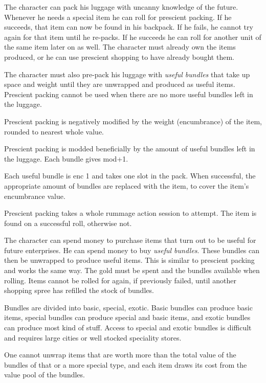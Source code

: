  The character can pack his luggage with uncanny knowledge of the future. Whenever he needs a special item he can roll for prescient packing. If he succeeds, that item can now be found in his backpack. If he fails, he cannot try again for that item until he re-packs. If he succeeds he can roll for another unit of the same item later on as well.
The character must already own the items produced, or he can use prescient shopping to have already bought them.

The character must also pre-pack his luggage with \emph{useful bundles} that take up space and weight until they are unwrapped and produced as useful items. Prescient packing cannot be used when there are no more useful bundles left in the luggage.

Prescient packing is negatively modified by the weight (encumbrance) of the item, rounded to nearest whole value.

Prescient packing is modded beneficially by the amount of useful bundles left in the luggage. Each bundle gives mod+1.

Each useful bundle is enc 1 and takes one slot in the pack. When successful, the appropriate amount of bundles are replaced with the item, to cover the item's encumbrance value.

Prescient packing takes a whole rummage action session to attempt. The item is found on a successful roll, otherwise not.


 The character can spend money to purchase items that turn out to be useful for future enterprises. He can spend money to buy \emph{useful bundles}. These bundles can then be unwrapped to produce useful items. This is similar to prescient packing and works the same way.
The gold must be spent and the bundles available when rolling. Items cannot be rolled for again, if previously failed, until another shopping spree has refilled the stock of bundles.

Bundles are divided into basic, special, exotic. Basic bundles can produce basic items, special bundles can produce special and basic items, and exotic bundles can produce most kind of stuff. Access to special and exotic bundles is difficult and requires large cities or well stocked speciality stores.

One cannot unwrap items that are worth more than the total value of the bundles of that or a more special type, and each item draws its cost from the value pool of the bundles.

